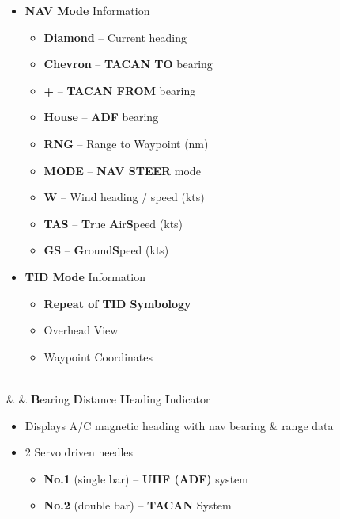 \documentclass[fontInter]{TechCheck}
\begin{document}
\begin{listlongtable}
		\begin{minipage}[t]{\linewidth}
			\vspace{-7pt}
			\begin{itemize}
				\item \textbf{NAV Mode} Information
				\begin{itemize}
					\item \textbf{Diamond} -- Current heading
					\item \textbf{Chevron} -- \textbf{TACAN TO} bearing
					\item \textbf{+} -- \textbf{TACAN FROM} bearing
					\item \textbf{House} -- \textbf{ADF} bearing
					\item \textbf{RNG} -- Range to Waypoint (nm)
					\item \textbf{MODE} -- \textbf{NAV STEER} mode
					\item \textbf{W} -- Wind heading / speed (kts)
					\item \textbf{TAS} -- \textbf{T}rue \textbf{A}ir\textbf{S}peed (kts)
					\item \textbf{GS} -- \textbf{G}round\textbf{S}peed (kts)
				\end{itemize}
				\item \textbf{TID Mode} Information
				\begin{itemize}
					\item \textbf{Repeat of TID Symbology}
					\item Overhead View
					\item Waypoint Coordinates
				\end{itemize}
			\end{itemize}
		\end{minipage} \\
		\midrule
		\textbf{\textbullet} &  & \textbf{B}earing \textbf{D}istance \textbf{H}eading \textbf{I}ndicator
		\begin{minipage}[t]{\linewidth}
			\vspace{-7pt}
			\begin{itemize}
				\item Displays A/C magnetic heading with nav bearing \& range data
				\item 2 Servo driven needles
				\begin{itemize}
					\item \textbf{No.1} (single bar) -- \textbf{UHF (ADF)} system
					\item \textbf{No.2} (double bar) -- \textbf{TACAN} System
				\end{itemize}
			\end{itemize}
		\end{minipage} \\
	\end{listlongtable}
\end{document}
